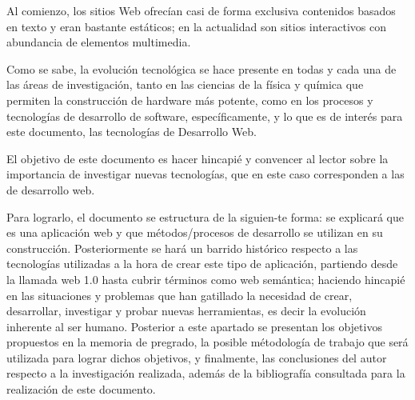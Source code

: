 Al comienzo, los sitios Web ofrecían casi de forma exclusiva contenidos basados en texto 
y eran bastante estáticos; en la actualidad son sitios interactivos con abundancia de elementos multimedia.

Como se sabe, la evolución tecnológica se hace presente en todas y cada una de las áreas de investigación, 
tanto en las ciencias de la física y química que permiten la construcción de hardware más potente, como en 
los procesos y tecnologías de desarrollo de software, específicamente, y lo que es de interés para este documento, 
las tecnologías de Desarrollo Web.


El objetivo de este documento es hacer hincapié y convencer al lector sobre la importancia de investigar nuevas
tecnologías, que en este caso corresponden a las de desarrollo web.

Para lograrlo, el documento se estructura de la siguien-te forma: se explicará que es una aplicación web y que métodos/procesos
de desarrollo se utilizan en su construcción. Posteriormente se hará un barrido histórico respecto a las tecnologías utilizadas
a la hora de crear este tipo de aplicación, partiendo desde la llamada web 1.0 hasta cubrir términos como web semántica; haciendo
hincapié en las situaciones y problemas que han gatillado la necesidad de crear, desarrollar, investigar y probar nuevas herramientas,
es decir la evolución inherente al ser humano. Posterior a este apartado se presentan los objetivos propuestos en la memoria de pregrado,
la posible métodología de trabajo que será utilizada para lograr dichos objetivos, y finalmente, las conclusiones del autor respecto a 
la investigación realizada, además de la bibliografía consultada para la realización de este documento.


